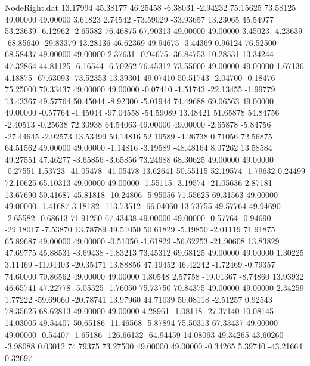 \begin{filecontents}{NodeRight.dat}
  13.17994   45.38177   46.25458    -6.38031   -2.94232   75.15625   73.58125   49.00000   49.00000    3.61823    2.74542  -73.59029  -33.93657
  13.23065   45.54977   53.23639    -6.12962   -2.65582   76.46875   67.90313   49.00000   49.00000    3.45023   -4.23639  -68.85640  -29.83379
  13.28136   46.62369   49.94675    -3.44369    0.96124   76.52500   68.58437   49.00000   49.00000    2.37631   -0.94675  -36.84753   10.28531
  13.34244   47.32864   44.81125    -6.16544   -6.70262   76.45312   73.55000   49.00000   49.00000    1.67136    4.18875  -67.63093  -73.52353
  13.39301   49.07410   50.51743    -2.04700   -0.18476   75.25000   70.33437   49.00000   49.00000   -0.07410   -1.51743  -22.13455   -1.99779
  13.43367   49.57764   50.45044    -8.92300   -5.01944   74.49688   69.06563   49.00000   49.00000   -0.57764   -1.45044  -97.04558  -54.59089
  13.48421   51.65878   54.84756    -2.40513   -0.25638   72.30938   64.54063   49.00000   49.00000   -2.65878   -5.84756  -27.44645   -2.92573
  13.53499   50.14816   52.19589    -4.26738    0.71056   72.56875   64.51562   49.00000   49.00000   -1.14816   -3.19589  -48.48164    8.07262
  13.58584   49.27551   47.46277    -3.65856   -3.65856   73.24688   68.30625   49.00000   49.00000   -0.27551    1.53723  -41.05478  -41.05478
  13.62641   50.55115   52.19574    -1.79632    0.24499   72.10625   65.10313   49.00000   49.00000   -1.55115   -3.19574  -21.05636    2.87181
  13.67690   50.41687   45.81818   -10.24806   -5.95056   71.55625   69.31563   49.00000   49.00000   -1.41687    3.18182 -113.73512  -66.04060
  13.73755   49.57764   49.94690    -2.65582   -0.68613   71.91250   67.43438   49.00000   49.00000   -0.57764   -0.94690  -29.18017   -7.53870
  13.78789   49.51050   50.61829    -5.19850   -2.01119   71.91875   65.89687   49.00000   49.00000   -0.51050   -1.61829  -56.62253  -21.90608
  13.83829   47.69775   45.88531    -3.69438   -1.83213   73.45312   69.68125   49.00000   49.00000    1.30225    3.11469  -41.04403  -20.35471
  13.88856   47.19452   46.42242    -1.72469   -0.79357   74.60000   70.86562   49.00000   49.00000    1.80548    2.57758  -19.01367   -8.74860
  13.93932   46.65741   47.22778    -5.05525   -1.76050   75.73750   70.84375   49.00000   49.00000    2.34259    1.77222  -59.69060  -20.78741
  13.97960   44.71039   50.08118    -2.51257    0.92543   78.35625   68.62813   49.00000   49.00000    4.28961   -1.08118  -27.37140   10.08145
  14.03005   49.54407   50.65186   -11.46568   -5.87894   75.50313   67.33437   49.00000   49.00000   -0.54407   -1.65186 -126.66132  -64.94459
  14.08063   49.34265   43.60260    -3.98088    0.03012   74.79375   73.27500   49.00000   49.00000   -0.34265    5.39740  -43.21664    0.32697

\end{filecontents}
